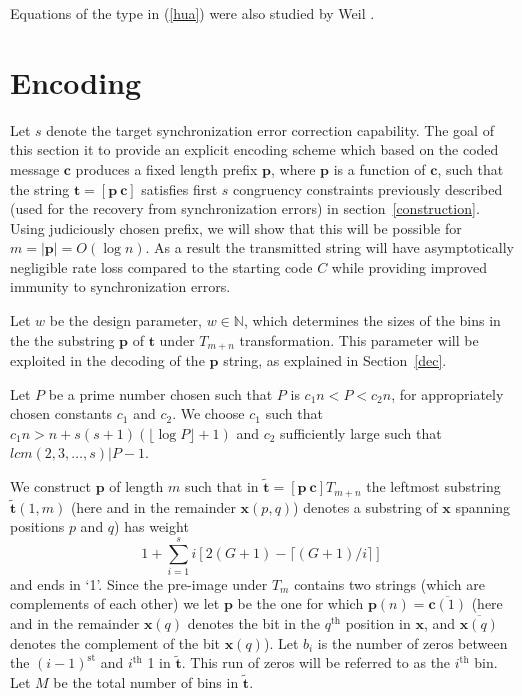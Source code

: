 Equations of the type in (\ref{hua}) were also studied by Weil
\cite{weil:49}.
\section{Encoding}\label{enc}

Let $s$ denote the target synchronization error correction
capability. The goal of this section it to provide an explicit
encoding scheme which based on the coded message $\mathbf{c}$
produces a fixed length prefix $\mathbf{p}$, where $\mathbf{p}$ is
a function of $\mathbf{c}$, such that the string $\mathbf{t}=[
\mathbf{p} ~ \mathbf{c} ]$ satisfies first $s$ congruency
constraints previously described (used for the recovery from
synchronization errors) in section~\ref{construction}. Using
judiciously chosen prefix, we will show that this will be possible
for $m=|\mathbf{p}|=O(\log n)$. As a result the transmitted string
will have asymptotically negligible rate loss compared to the
starting code $C$ while providing improved immunity to
synchronization errors.

 Let $w$ be
the design parameter, $w \in \mathbb{N}$, which determines the
sizes of the bins in the the substring $\mathbf{p}$ of
$\mathbf{t}$ under $T_{m+n}$ transformation. This parameter will
be exploited in the decoding of the $\mathbf{p}$ string, as
explained in Section~\ref{dec}.

 Let $P$ be a prime number chosen such that $P$ is
$c_1n < P< c_2n$, for appropriately chosen constants $c_1$ and
$c_2$.  We choose $c_1$ such that $c_1n>n+s(s+1)(\lfloor\log
P\rfloor+1)$ and $c_2$ sufficiently large such that
$lcm(2,3,\dots,s)|P-1$.


 We
construct $\mathbf{p}$ of length $m$ such that in
$\mathbf{\tilde{t}}=[\mathbf{p}~ \mathbf{c}]T_{m+n}$ the leftmost
substring $\mathbf{\tilde{t}}(1,m)$ (here and in the remainder
$\mathbf{x}(p,q)$) denotes a substring of $\mathbf{x}$ spanning
positions $p$ and $q$) has weight \begin{equation}\label{sum1}
1+\sum_{i=1}^s i\left[ 2(G+1)-\lceil(G+1)/i \rceil
\right]\end{equation} and ends in `1'. Since the pre-image under
$T_m$ contains two strings (which are complements of each other)
we let $\mathbf{p}$ be the one for which
$\mathbf{p}(n)=\overline{\mathbf{c}(1)}$ (here and in the
remainder $\mathbf{x}(q)$ denotes the bit in the $q^{\text{th}}$
position in $\mathbf{x}$, and $\overline{\mathbf{x}(q)}$ denotes
the complement of the bit $\mathbf{x}(q)$). %
Let $b_i$ is the number of zeros between the $(i-1)^{\text{st}}$
and $i^{\text{th}}$ 1 in $\mathbf{\tilde{t}}$. This run of zeros
will be referred to as the $i^{\text{th}}$ bin. Let $M$ be the
total number of bins in $\mathbf{\tilde{t}}$.


